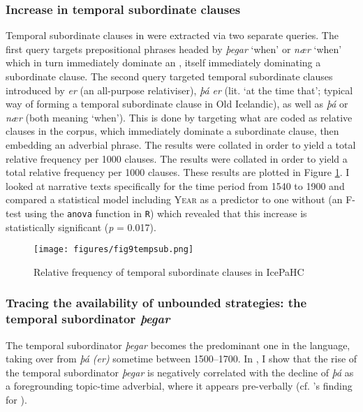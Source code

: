 \documentclass[output=paper,colorlinks,citecolor=brown]{langscibook}
\begin{document}
\subsubsection{Increase in temporal subordinate clauses}\label{sec:Chark5.2.1}

Temporal subordinate clauses in  were extracted via two separate queries. The first query targets prepositional phrases headed by \textit{þegar} `when' or \textit{nær} `when' which in turn immediately dominate an , itself immediately dominating a subordinate clause. The second query targeted temporal subordinate clauses introduced by \textit{er} (an all-purpose relativiser), \textit{þá er} (lit. `at the time that'; typical way of forming a temporal subordinate clause in Old Icelandic), as well as \textit{þá} or \textit{nær} (both meaning `when'). This is done by targeting what are coded as relative clauses in the corpus, which immediately dominate a subordinate clause, then embedding an adverbial phrase. The results were collated in order to yield a total relative frequency per 1000 clauses. The results were collated in order to yield a total relative frequency per 1000 clauses. These results are plotted in Figure \ref{ex:tempsub}. I looked at narrative texts specifically for the time period from 1540 to 1900 and compared a statistical model including \textsc{Year} as a predictor to one without (an F-test using the \texttt{anova} function in \texttt{R}) which revealed that this increase is statistically significant (\textit{p} = 0.017).

 \begin{figure}
    \centering
    \texttt{[image: figures/fig9tempsub.png]}
    \caption{Relative frequency of temporal subordinate clauses in IcePaHC
}\label{ex:tempsub}
\end{figure}


\subsubsection{Tracing the availability of unbounded strategies: the temporal subordinator \textit{þegar}}\label{sec:Chark5.2.2}

The temporal subordinator \textit{þegar} becomes the predominant one in the language, taking over from \textit{þá (er)} sometime between 1500--1700. In , I show that the rise of the temporal subordinator \textit{þegar} is negatively correlated with the decline of \textit{þá} as a foregrounding topic-time adverbial, where it appears pre-verbally (cf. \citet{warvik1995a}'s finding for ).
\end{document}
